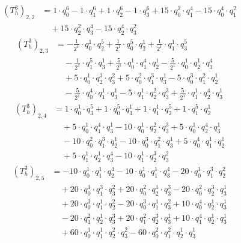 \begin{align*}(T_{h}^3)_{2,2}&=1\cdot q_0^{6}-1\cdot q_1^{6}+1\cdot q_2^{6}-1\cdot q_3^{6}+15\cdot q_0^{2}\cdot q_1^{4}-15\cdot q_0^{4}\cdot q_1^{2}\\
&\quad +15\cdot q_2^{2}\cdot q_3^{4}-15\cdot q_2^{4}\cdot q_3^{2}\end{align*}
\begin{align*}(T_{h}^3)_{2,3}&=-\frac{1}{2^{1}}\cdot q_0^{1}\cdot q_2^{5}+\frac{1}{2^{1}}\cdot q_0^{5}\cdot q_2^{1}+\frac{1}{2^{1}}\cdot q_1^{1}\cdot q_3^{5}\\
&\quad -\frac{1}{2^{1}}\cdot q_1^{5}\cdot q_3^{1}+\frac{5}{2^{1}}\cdot q_0^{1}\cdot q_1^{4}\cdot q_2^{1}-\frac{5}{2^{1}}\cdot q_0^{1}\cdot q_2^{1}\cdot q_3^{4}\\
&\quad +5\cdot q_0^{1}\cdot q_2^{3}\cdot q_3^{2}+5\cdot q_0^{2}\cdot q_1^{3}\cdot q_3^{1}-5\cdot q_0^{3}\cdot q_1^{2}\cdot q_2^{1}\\
&\quad -\frac{5}{2^{1}}\cdot q_0^{4}\cdot q_1^{1}\cdot q_3^{1}-5\cdot q_1^{1}\cdot q_2^{2}\cdot q_3^{3}+\frac{5}{2^{1}}\cdot q_1^{1}\cdot q_2^{4}\cdot q_3^{1}\end{align*}
\begin{align*}(T_{h}^3)_{2,4}&=1\cdot q_0^{1}\cdot q_3^{5}+1\cdot q_0^{5}\cdot q_3^{1}+1\cdot q_1^{1}\cdot q_2^{5}+1\cdot q_1^{5}\cdot q_2^{1}\\
&\quad +5\cdot q_0^{1}\cdot q_1^{4}\cdot q_3^{1}-10\cdot q_0^{1}\cdot q_2^{2}\cdot q_3^{3}+5\cdot q_0^{1}\cdot q_2^{4}\cdot q_3^{1}\\
&\quad -10\cdot q_0^{2}\cdot q_1^{3}\cdot q_2^{1}-10\cdot q_0^{3}\cdot q_1^{2}\cdot q_3^{1}+5\cdot q_0^{4}\cdot q_1^{1}\cdot q_2^{1}\\
&\quad +5\cdot q_1^{1}\cdot q_2^{1}\cdot q_3^{4}-10\cdot q_1^{1}\cdot q_2^{3}\cdot q_3^{2}\end{align*}
\begin{align*}(T_{h}^3)_{2,5}&=-10\cdot q_0^{1}\cdot q_1^{1}\cdot q_2^{4}-10\cdot q_0^{1}\cdot q_1^{1}\cdot q_3^{4}-20\cdot q_0^{1}\cdot q_1^{3}\cdot q_2^{2}\\
&\quad +20\cdot q_0^{1}\cdot q_1^{3}\cdot q_3^{2}+20\cdot q_0^{2}\cdot q_2^{1}\cdot q_3^{3}-20\cdot q_0^{2}\cdot q_2^{3}\cdot q_3^{1}\\
&\quad +20\cdot q_0^{3}\cdot q_1^{1}\cdot q_2^{2}-20\cdot q_0^{3}\cdot q_1^{1}\cdot q_3^{2}+10\cdot q_0^{4}\cdot q_2^{1}\cdot q_3^{1}\\
&\quad -20\cdot q_1^{2}\cdot q_2^{1}\cdot q_3^{3}+20\cdot q_1^{2}\cdot q_2^{3}\cdot q_3^{1}+10\cdot q_1^{4}\cdot q_2^{1}\cdot q_3^{1}\\
&\quad +60\cdot q_0^{1}\cdot q_1^{1}\cdot q_2^{2}\cdot q_3^{2}-60\cdot q_0^{2}\cdot q_1^{2}\cdot q_2^{1}\cdot q_3^{1}\end{align*}
